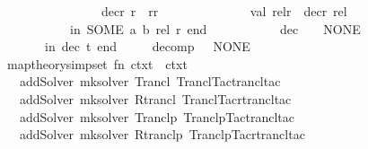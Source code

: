 \begin{isabellebody}
\ \ \ \ \ \ \ \ \ \ \ \ \ \ \ \ {\isacharbar}{\kern0pt}\ decr\ r\ {\isacharequal}{\kern0pt}\ {\isacharparenleft}{\kern0pt}r{\isacharcomma}{\kern0pt}{\isachardoublequote}{\kern0pt}r{\isachardoublequote}{\kern0pt}{\isacharparenright}{\kern0pt}{\isacharsemicolon}{\kern0pt}\isanewline
\ \ \ \ \ \ \ \ \ \ \ \ \ \ val\ {\isacharparenleft}{\kern0pt}rel{\isacharcomma}{\kern0pt}r{\isacharparenright}{\kern0pt}\ {\isacharequal}{\kern0pt}\ decr\ rel{\isacharsemicolon}{\kern0pt}\isanewline
\ \ \ \ \ \ \ \ \ \ \ \ in\ SOME\ {\isacharparenleft}{\kern0pt}a{\isacharcomma}{\kern0pt}\ b{\isacharcomma}{\kern0pt}\ rel{\isacharcomma}{\kern0pt}\ r{\isacharparenright}{\kern0pt}\ end\isanewline
\ \ \ \ \ \ \ \ \ \ {\isacharbar}{\kern0pt}\ dec\ {\isacharunderscore}{\kern0pt}\ {\isacharequal}{\kern0pt}\ \ NONE\isanewline
\ \ \ \ \ \ \ \ in\ dec\ t\ end\isanewline
\ \ \ \ {\isacharbar}{\kern0pt}\ decomp\ {\isacharunderscore}{\kern0pt}\ {\isacharequal}{\kern0pt}\ NONE{\isacharsemicolon}{\kern0pt}\isanewline
{\isacharparenright}{\kern0pt}{\isacharsemicolon}{\kern0pt}\isanewline
{\isacartoucheclose}\isanewline
\isanewline
{}\isamarkupfalse%
\ {\isacartoucheopen}\isanewline
\ \ map{\isacharunderscore}{\kern0pt}theory{\isacharunderscore}{\kern0pt}simpset\ {\isacharparenleft}{\kern0pt}fn\ ctxt\ {\isacharequal}{\kern0pt}{\isachargreater}{\kern0pt}\ ctxt\isanewline
\ \ \ \ addSolver\ {\isacharparenleft}{\kern0pt}mk{\isacharunderscore}{\kern0pt}solver\ {\isachardoublequote}{\kern0pt}Trancl{\isachardoublequote}{\kern0pt}\ Trancl{\isacharunderscore}{\kern0pt}Tac{\isachardot}{\kern0pt}trancl{\isacharunderscore}{\kern0pt}tac{\isacharparenright}{\kern0pt}\isanewline
\ \ \ \ addSolver\ {\isacharparenleft}{\kern0pt}mk{\isacharunderscore}{\kern0pt}solver\ {\isachardoublequote}{\kern0pt}Rtrancl{\isachardoublequote}{\kern0pt}\ Trancl{\isacharunderscore}{\kern0pt}Tac{\isachardot}{\kern0pt}rtrancl{\isacharunderscore}{\kern0pt}tac{\isacharparenright}{\kern0pt}\isanewline
\ \ \ \ addSolver\ {\isacharparenleft}{\kern0pt}mk{\isacharunderscore}{\kern0pt}solver\ {\isachardoublequote}{\kern0pt}Tranclp{\isachardoublequote}{\kern0pt}\ Tranclp{\isacharunderscore}{\kern0pt}Tac{\isachardot}{\kern0pt}trancl{\isacharunderscore}{\kern0pt}tac{\isacharparenright}{\kern0pt}\isanewline
\ \ \ \ addSolver\ {\isacharparenleft}{\kern0pt}mk{\isacharunderscore}{\kern0pt}solver\ {\isachardoublequote}{\kern0pt}Rtranclp{\isachardoublequote}{\kern0pt}\ Tranclp{\isacharunderscore}{\kern0pt}Tac{\isachardot}{\kern0pt}rtrancl{\isacharunderscore}{\kern0pt}tac{\isacharparenright}{\kern0pt}{\isacharparenright}{\kern0pt}\isanewline

\end{isabellebody}
